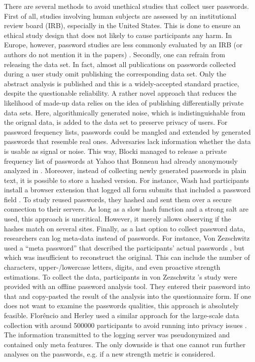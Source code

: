 There are several methods to avoid unethical studies that collect user passwords. 
First of all, studies involving human subjects are assessed by an institutional review board (IRB), especially in the United States. This is done to ensure an ethical study design that does not likely to cause participants any harm. In Europe, however, password studies are less commonly evaluated by an IRB (or authors do not mention it in the papers) \ar. 
Secondly, one can refrain from releasing the data set. In fact, almost all publications on passwords collected during a user study omit publishing the corresponding data set. Only the abstract analysis is published and this is a widely-accepted standard practice, despite the questionable reliability. 
A rather novel approach that reduces the likelihood of made-up data relies on the idea of publishing differentially private data sets. Here, algorithmically generated noise, which is indistinguishable from the orignal data, is added to the data set to preserve privacy of users. For password frequency lists, passwords could be mangled and extended by generated passwords that resemble real ones. Adversaries lack information whether the data is usable as signal or noise.
This way, Blocki \etal managed to release a private frequency list of passwords at Yahoo that Bonneau had already anonymously analyzed in \cite{Bonneau2012ScienceOfGuessing}. 
Moreover, instead of collecting newly generated passwords in plain text, it is possible to store a hashed version. For instance, Wash \etal had participants install a browser extension that logged all form submits that included a password field \cite{Wash2016UnderstandingPasswordChoices}. To study reused passwords, they hashed and sent them over a secure connection to their servers. As long as a slow hash function and a strong salt are used, this approach is uncritical. However, it merely allows observing if the hashes match on several sites.
Finally, as a last option to collect password data, researchers can log meta-data instead of passwords. For instance, Von Zezschwitz \etal used a ``meta password'' that described the participants' actual passwords \cite{VonZezschwitz2013SurvivalShortest}, but which was insufficient to reconstruct the original. This can include the number of characters, upper-/lowercase letters, digits, and even proactive strength estimations. To collect the data, participants in von Zezschwitz \etal's study were provided with an offline password analysis tool. They entered their password into that and copy-pasted the result of the analysis into the questionnaire form. If one does not want to examine the passwords qualities, this approach is absolutely feasible. Florêncio and Herley used a similar approach for the large-scale data collection with around 500000 participants to avoid running into privacy issues \cite{Florencio2007LargeScaleStudyPasswordHabits}. The information transmitted to the logging server was pseudonymized and contained only meta features. The only downside is that one cannot run further analyses on the passwords, e.g. if a new strength metric is considered.

